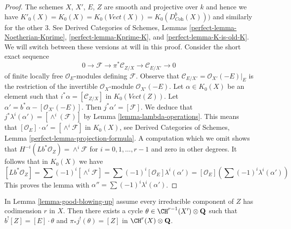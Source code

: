 \begin{proof}
The schemes $X$, $X'$, $E$, $Z$ are smooth and projective over
$k$ and hence we have $K'_0(X) = K_0(X) = K_0(\textit{Vect}(X)) =
K_0(D^b_{\textit{Coh}}(X)))$
and similarly for the other $3$. See
Derived Categories of Schemes, Lemmas \ref{perfect-lemma-Noetherian-Kprime},
\ref{perfect-lemma-Kprime-K}, and \ref{perfect-lemma-K-is-old-K}.
We will switch between these versions at will in this proof.
Consider the short exact sequence
$$
0 \to \mathcal{F} \to \pi^*\mathcal{C}_{Z/X} \to \mathcal{C}_{E/X'} \to 0
$$
of finite locally free $\mathcal{O}_E$-modules defining $\mathcal{F}$.
Observe that $\mathcal{C}_{E/X'} = \mathcal{O}_{X'}(-E)|_E$
is the restriction of the invertible $\mathcal{O}_X$-module
$\mathcal{O}_{X'}(-E)$.
Let $\alpha \in K_0(X)$ be an element such that
$i^*\alpha = [\mathcal{C}_{Z/X}]$ in $K_0(\textit{Vect}(Z))$.
Let $\alpha' = b^*\alpha - [\mathcal{O}_{X'}(-E)]$.
Then $j^*\alpha' = [\mathcal{F}]$. We deduce that
$j^*\lambda^i(\alpha') = [\wedge^i(\mathcal{F})]$ by
Lemma \ref{lemma-lambda-operations}.
This means that $[\mathcal{O}_E] \cdot \alpha' = [\wedge^i\mathcal{F}]$
in $K_0(X)$, see
Derived Categories of Schemes, Lemma \ref{perfect-lemma-projection-formula}.
A computation which we omit shows that
$H^{-i}(Lb^*\mathcal{O}_Z) = \wedge^i\mathcal{F}$
for $i = 0, 1, \ldots, r - 1$ and zero in other degrees.
It follows that in $K_0(X)$ we have
$$
[Lb^*\mathcal{O}_Z] = \sum (-1)^i[\wedge^i\mathcal{F}] =
\sum (-1)^i [\mathcal{O}_E] \lambda^i(\alpha') =
[\mathcal{O}_E] \left(\sum (-1)^i \lambda^i(\alpha')\right)
$$
This proves the lemma with $\alpha'' = \sum (-1)^i \lambda^i(\alpha')$.
\end{proof}

\begin{lemma}
\label{lemma-divide-pullback-good-blowing-up}
In Lemma \ref{lemma-good-blowing-up} assume every irreducible component
of $Z$ has codimension $r$ in $X$.
Then there exists a cycle $\theta \in \CH^{r - 1}(X') \otimes \mathbf{Q}$
such that $b^![Z] = [E] \cdot \theta$ and
$\pi_*j^!(\theta) = [Z]$ in $\CH^r(X) \otimes \mathbf{Q}$.
\end{lemma}

